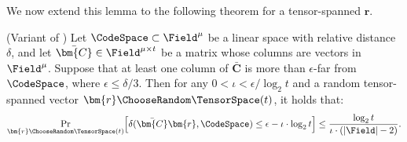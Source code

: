 We now extend this lemma to the following theorem for a tensor-spanned $\bm{r}$.

\begin{theorem}
\label{theorem:tensordistance}
{\normalfont (Variant of \cite[Theorem~4.1]{ccc/Ben-SassonKS18})}
Let $\CodeSpace \subset \Field^\mu$ be a linear space with relative distance $\delta$, and let $\bar{\bm{C}} \in \Field^{\mu \times t}$ be a matrix whose columns are vectors in $\Field^\mu$. Suppose that at least one column of $\bar{\bm{C}}$ is more than $\epsilon$-far from $\CodeSpace$, where $\epsilon \leq \delta/3$. Then for any $0 < \iota < \epsilon/\log_2 t$ and a random tensor-spanned vector $\bm{r} \ChooseRandom \TensorSpace(t)$, it holds that:
\[
    \Pr_{\bm{r} \ChooseRandom \TensorSpace(t)}\!\left[
        \delta(\bar{\bm{C}}\bm{r}, \CodeSpace) \le \epsilon - \iota \cdot \log_2 t
    \right]
    \le
    \frac{\log_2 t}{\iota \cdot (|\Field|-2)}.
\]
\end{theorem}


